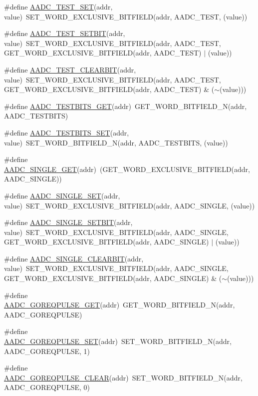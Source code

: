 \begin{DoxyCompactItemize}
\#define \hyperlink{a00542_a6a5626fc79d1aac18b9b405ca3b717cc}{AADC\_\-TEST\_\-SET}(addr, value)~SET\_\-WORD\_\-EXCLUSIVE\_\-BITFIELD(addr, AADC\_\-TEST, (value))
\item 
\#define \hyperlink{a00542_aecf89933deb2885bd455aa4b62e30e7c}{AADC\_\-TEST\_\-SETBIT}(addr, value)~SET\_\-WORD\_\-EXCLUSIVE\_\-BITFIELD(addr, AADC\_\-TEST, GET\_\-WORD\_\-EXCLUSIVE\_\-BITFIELD(addr, AADC\_\-TEST) $|$ (value))
\item 
\#define \hyperlink{a00542_ae7a750af5d4c206f38669eef959423b1}{AADC\_\-TEST\_\-CLEARBIT}(addr, value)~SET\_\-WORD\_\-EXCLUSIVE\_\-BITFIELD(addr, AADC\_\-TEST, GET\_\-WORD\_\-EXCLUSIVE\_\-BITFIELD(addr, AADC\_\-TEST) \& ($\sim$(value)))
\item 
\#define \hyperlink{a00542_a37c5de73377347e0ffa16865b00e9048}{AADC\_\-TESTBITS\_\-GET}(addr)~GET\_\-WORD\_\-BITFIELD\_\-N(addr, AADC\_\-TESTBITS)
\item 
\#define \hyperlink{a00542_a0f34a161223be22f10079859a63002f9}{AADC\_\-TESTBITS\_\-SET}(addr, value)~SET\_\-WORD\_\-BITFIELD\_\-N(addr, AADC\_\-TESTBITS, (value))
\item 
\#define \hyperlink{a00542_a9457bdb8c9178127b3603ed351cfc503}{AADC\_\-SINGLE\_\-GET}(addr)~(GET\_\-WORD\_\-EXCLUSIVE\_\-BITFIELD(addr, AADC\_\-SINGLE))
\item 
\#define \hyperlink{a00542_a000d78605a9cfc2e1d8f81410975c607}{AADC\_\-SINGLE\_\-SET}(addr, value)~SET\_\-WORD\_\-EXCLUSIVE\_\-BITFIELD(addr, AADC\_\-SINGLE, (value))
\item 
\#define \hyperlink{a00542_a7deef0cf4cb17e07249474da9bea3441}{AADC\_\-SINGLE\_\-SETBIT}(addr, value)~SET\_\-WORD\_\-EXCLUSIVE\_\-BITFIELD(addr, AADC\_\-SINGLE, GET\_\-WORD\_\-EXCLUSIVE\_\-BITFIELD(addr, AADC\_\-SINGLE) $|$ (value))
\item 
\#define \hyperlink{a00542_a1e32125127218688da321c1de296dd3e}{AADC\_\-SINGLE\_\-CLEARBIT}(addr, value)~SET\_\-WORD\_\-EXCLUSIVE\_\-BITFIELD(addr, AADC\_\-SINGLE, GET\_\-WORD\_\-EXCLUSIVE\_\-BITFIELD(addr, AADC\_\-SINGLE) \& ($\sim$(value)))
\item 
\#define \hyperlink{a00542_a0c0255babf2dd9c8580f9140b4dfec21}{AADC\_\-GOREQPULSE\_\-GET}(addr)~GET\_\-WORD\_\-BITFIELD\_\-N(addr, AADC\_\-GOREQPULSE)
\item 
\#define \hyperlink{a00542_a41cd30e752200849dfe3ef1ea6ed881e}{AADC\_\-GOREQPULSE\_\-SET}(addr)~SET\_\-WORD\_\-BITFIELD\_\-N(addr, AADC\_\-GOREQPULSE, 1)
\item 
\#define \hyperlink{a00542_aab2edee3f31b874861ac93cbf651291c}{AADC\_\-GOREQPULSE\_\-CLEAR}(addr)~SET\_\-WORD\_\-BITFIELD\_\-N(addr, AADC\_\-GOREQPULSE, 0)

\end{DoxyCompactItemize}
